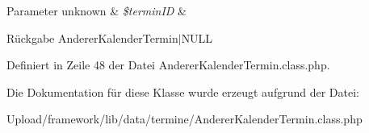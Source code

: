 \begin{DoxyParams}[1]{Parameter}
unknown & {\em \$termin\+ID} & \\
\hline
\end{DoxyParams}
\begin{DoxyReturn}{Rückgabe}
Anderer\+Kalender\+Termin$\vert$\+N\+U\+LL 
\end{DoxyReturn}


Definiert in Zeile 48 der Datei Anderer\+Kalender\+Termin.\+class.\+php.



Die Dokumentation für diese Klasse wurde erzeugt aufgrund der Datei\+:\begin{DoxyCompactItemize}
\item 
Upload/framework/lib/data/termine/Anderer\+Kalender\+Termin.\+class.\+php\end{DoxyCompactItemize}
